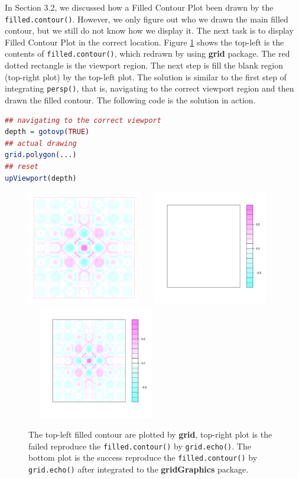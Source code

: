 \documentclass[11pt]{report}
\begin{document}
In Section 3.2, we discussed how a Filled Contour Plot been drawn by the \texttt{filled.contour()}. However, we only figure out who we drawn the main filled contour, but we still do not know how we display it. The next task is to display Filled Contour Plot in the correct location. Figure \ref{figure_4.6} shows the top-left is the contents of \texttt{filled.contour()}, which redrawn by using \textbf{grid} package. The red dotted rectangle is the viewport region. The next step is fill the blank region (top-right plot) by the top-left plot. The solution is similar to the first step of integrating \texttt{persp()}, that is, navigating to the correct viewport region and then drawn the filled contour. The following code is the solution in action.
\begin{lstlisting}[language = R]
## navigating to the correct viewport
depth = gotovp(TRUE)
## actual drawing
grid.polygon(...)
## reset
upViewport(depth)
\end{lstlisting}
\begin{figure}[h]
	\begin{center}
		\includegraphics[height = 5cm, width = 5cm]{figure/filledContour_origin_02.pdf}
		\includegraphics[height = 5cm, width = 6cm]{figure/filledContour_origin_03.pdf}
		\includegraphics[height = 5cm, width = 6cm]{figure/filledContour_origin_01.pdf}
		\caption{The top-left filled contour are plotted by \textbf{grid}, top-right plot is the failed reproduce the \texttt{filled.contour()} by \texttt{grid.echo()}. The bottom plot is the success reproduce the \texttt{filled.contour()} by \texttt{grid.echo()} after integrated to the \textbf{gridGraphics} package.}
		\label{figure_4.6}
	\end{center}
\end{figure}
\end{document}
